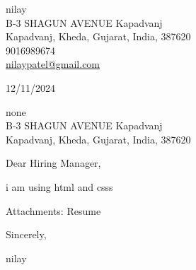 \documentclass[11pt,a4paper]{article}
\begin{document}
\thispagestyle{empty}

\begin{flushleft}
nilay\\
B-3 SHAGUN AVENUE Kapadvanj\\
Kapadvanj, Kheda, Gujarat, India, 387620\\
9016989674\\
\href{mailto:nilaypatel@gmail.com}{nilaypatel@gmail.com}
\end{flushleft}

\begin{flushright}
12/11/2024
\end{flushright}

\vspace{0.5cm}
none\\
B-3 SHAGUN AVENUE Kapadvanj\\
Kapadvanj, Kheda, Gujarat, India, 387620

\vspace{0.5cm}
\noindent Dear Hiring Manager,

\vspace{0.3cm}
i am using html and csss

\vspace{0.5cm}
\noindent Attachments: Resume

\vspace{0.5cm}
\noindent Sincerely,

\vspace{1cm}
\noindent nilay
\end{document}
